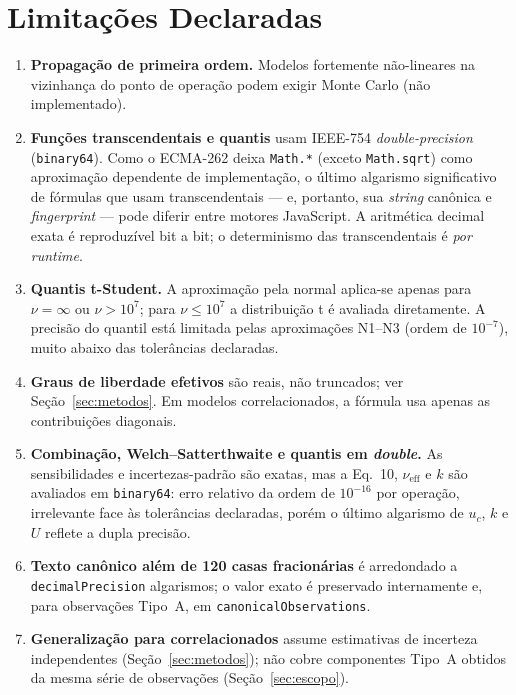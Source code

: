 \documentclass[11pt,a4paper]{article}
\begin{document}
\section{Limitações Declaradas}
\label{sec:limitacoes}

\begin{enumerate}
  \item \textbf{Propagação de primeira ordem.} Modelos fortemente não-lineares na vizinhança do ponto de operação podem exigir Monte Carlo (não implementado).
  \item \textbf{Funções transcendentais e quantis} usam IEEE-754 \emph{double-precision} (\texttt{binary64}). Como o ECMA-262 deixa \texttt{Math.*} (exceto \texttt{Math.sqrt}) como aproximação dependente de implementação, o último algarismo significativo de fórmulas que usam transcendentais --- e, portanto, sua \emph{string} canônica e \emph{fingerprint} --- pode diferir entre motores JavaScript. A aritmética decimal exata é reproduzível bit a bit; o determinismo das transcendentais é \emph{por runtime}.
  \item \textbf{Quantis t-Student.} A aproximação pela normal aplica-se apenas para \(\nu = \infty\) ou \(\nu > 10^{7}\); para \(\nu \leq 10^{7}\) a distribuição t é avaliada diretamente. A precisão do quantil está limitada pelas aproximações N1--N3 (ordem de \(10^{-7}\)), muito abaixo das tolerâncias declaradas.
  \item \textbf{Graus de liberdade efetivos} são reais, não truncados; ver Seção~\ref{sec:metodos}. Em modelos correlacionados, a fórmula usa apenas as contribuições diagonais.
  \item \textbf{Combinação, Welch--Satterthwaite e quantis em \emph{double}.} As sensibilidades e incertezas-padrão são exatas, mas a Eq.~10, \(\nu_{\text{eff}}\) e \(k\) são avaliados em \texttt{binary64}: erro relativo da ordem de \(10^{-16}\) por operação, irrelevante face às tolerâncias declaradas, porém o último algarismo de \(u_c\), \(k\) e \(U\) reflete a dupla precisão.
  \item \textbf{Texto canônico além de 120 casas fracionárias} é arredondado a \texttt{decimalPrecision} algarismos; o valor exato é preservado internamente e, para observações Tipo~A, em \texttt{canonicalObservations}.
  \item \textbf{Generalização para correlacionados} assume estimativas de incerteza independentes (Seção~\ref{sec:metodos}); não cobre componentes Tipo~A obtidos da mesma série de observações (Seção~\ref{sec:escopo}).

\end{enumerate}
\end{document}
